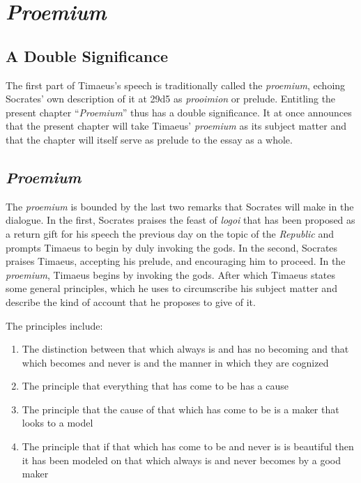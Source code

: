 
\chapter{\emph{Proemium}} %
\label{cha:proemium}

\section{A Double Significance} %
\label{sec:a_double_significance}

The first part of Timaeus's speech is traditionally called the \emph{proemium}, echoing Socrates' own description of it at 29d5 as \emph{prooimion} or prelude. Entitling the present chapter ``\emph{Proemium}'' thus has a double significance. It at once announces that the present chapter will take Timaeus' \emph{proemium} as its subject matter and that the chapter will itself serve as prelude to the essay as a whole.



\section{\emph{Proemium}} %
\label{sec:proemium}

The \emph{proemium} is bounded by the last two remarks that Socrates will make in the dialogue. In the first, Socrates praises the feast of \emph{logoi} that has been proposed as a return gift for his speech the previous day on the topic of the \emph{Republic} and prompts Timaeus to begin by duly invoking the gods. In the second, Socrates praises Timaeus, accepting his prelude, and encouraging him to proceed. In the \emph{proemium}, Timaeus begins by invoking the gods. After which Timaeus states some general principles, which he uses to circumscribe his subject matter and describe the kind of account that he proposes to give of it. 

The principles include:
\begin{enumerate}[(1)]
	\item The distinction between that which always is and has no becoming and that which becomes and never is and the manner in which they are cognized
	\item The principle that everything that has come to be has a cause
	\item The principle that the cause of that which has come to be is a maker that looks to a model
	\item The principle that if that which has come to be and never is is beautiful then it has been modeled on that which always is and never becomes by a good maker
\end{enumerate}


